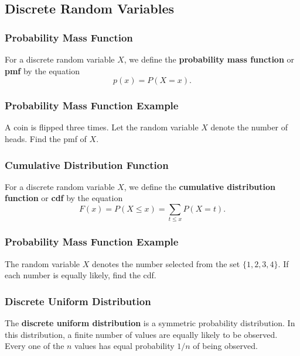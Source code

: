 \documentclass{beamer}
\begin{document}
\subsection{Discrete Random Variables}

\begin{frame}
\frametitle{Probability Mass Function}
\begin{Definition}
For a discrete random variable $X$, we define the {\bf probability mass function} or {\bf pmf} by the equation
$$
p(x) = P(X = x).
$$
\end{Definition}
\end{frame}

\begin{frame}[t]
\frametitle{Probability Mass Function Example}
\begin{Example}
A coin is flipped three times. Let the random variable $X$ denote the number of heads. Find the pmf of $X$.
\end{Example}

\end{frame}

\begin{frame}
\frametitle{Cumulative Distribution Function}
\begin{Definition}
For a discrete random variable $X$, we define the {\bf cumulative distribution function} or {\bf cdf} by the equation
$$
F(x) = P(X\leq x) = \sum_{t \leq x} P(X = t).
$$
\end{Definition}
\end{frame}

\begin{frame}[t]
\frametitle{Probability Mass Function Example}
\begin{Example}
The random variable $X$ denotes the number selected from the set $\{1, 2, 3, 4\}$. If each number is equally likely, find the cdf.
\end{Example}

\end{frame}

\begin{frame}
\frametitle{Discrete Uniform Distribution}
\begin{Definition}
The {\bf discrete uniform distribution} is a symmetric probability distribution. In this distribution, a finite number of values are equally likely to be observed. Every one of the $n$ values has equal probability $1/n$ of being observed.
\end{Definition}
\end{frame}
\end{document}
